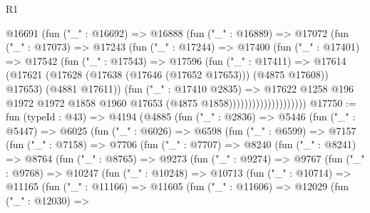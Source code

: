 \begin{lexlean}{R1}
\begin{coremodule}
                          @16691
                            (fun ("_" : @16692) =>
                            @16888
                              (fun ("_" : @16889) =>
                              @17072
                                (fun ("_" : @17073) =>
                                @17243
                                  (fun ("_" : @17244) =>
                                  @17400
                                    (fun ("_" : @17401) =>
                                    @17542
                                      (fun ("_" : @17543) =>
                                      @17596
                                        (fun ("_" : @17411) =>
                                        @17614
                                          (@17621
                                            (@17628
                                              (@17638 (@17646 (@17652 @17653)))
                                              (@4875 @17608))
                                            @17653)
                                          (@4881 @17611))
                                        (fun ("_" : @17410 @2835) =>
                                        @17622
                                          @1258
                                          @196
                                          @1972
                                          @1972
                                          @1858
                                          @1960
                                          @17653
                                          (@4875 @1858))))))))))))))))))))
@17750 := fun (typeId : @43) =>
  @4194
    (@4885
      (fun ("_" : @2836) =>
      @5446
        (fun ("_" : @5447) =>
        @6025
          (fun ("_" : @6026) =>
          @6598
            (fun ("_" : @6599) =>
            @7157
              (fun ("_" : @7158) =>
              @7706
                (fun ("_" : @7707) =>
                @8240
                  (fun ("_" : @8241) =>
                  @8764
                    (fun ("_" : @8765) =>
                    @9273
                      (fun ("_" : @9274) =>
                      @9767
                        (fun ("_" : @9768) =>
                        @10247
                          (fun ("_" : @10248) =>
                          @10713
                            (fun ("_" : @10714) =>
                            @11165
                              (fun ("_" : @11166) =>
                              @11605
                                (fun ("_" : @11606) =>
                                @12029
                                  (fun ("_" : @12030) =>

\end{coremodule}
\end{lexlean}
